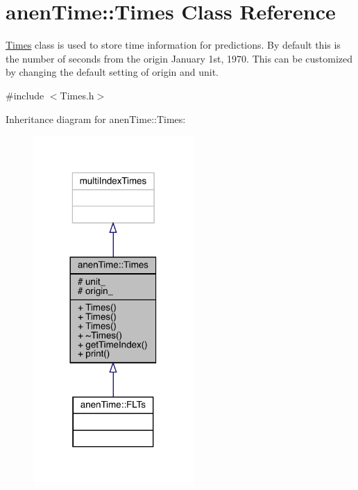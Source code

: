 \hypertarget{classanen_time_1_1_times}{}\section{anen\+Time\+:\+:Times Class Reference}
\label{classanen_time_1_1_times}


\mbox{\hyperlink{classanen_time_1_1_times}{Times}} class is used to store time information for predictions. By default this is the number of seconds from the origin January 1st, 1970. This can be customized by changing the default setting of origin and unit.  




{\ttfamily \#include $<$Times.\+h$>$}



Inheritance diagram for anen\+Time\+:\+:Times\+:\nopagebreak
\begin{figure}[H]
\begin{center}
\leavevmode
\includegraphics[width=173pt]{classanen_time_1_1_times__inherit__graph}
\end{center}
\end{figure}


